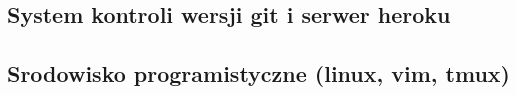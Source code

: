 \subsection{System kontroli wersji git i serwer heroku}
  


\subsection{Srodowisko programistyczne (linux, vim, tmux)}
